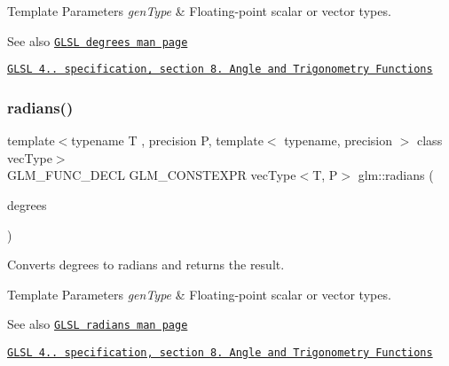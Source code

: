 \begin{DoxyTemplParams}{Template Parameters}
{\em gen\+Type} & Floating-\/point scalar or vector types.\\
\hline
\end{DoxyTemplParams}
\begin{DoxySeeAlso}{See also}
\href{http://www.opengl.org/sdk/docs/manglsl/xhtml/degrees.xml}{\tt G\+L\+SL degrees man page} 

\href{http://www.opengl.org/registry/doc/GLSLangSpec.4.20.8.pdf}{\tt G\+L\+SL 4.. specification, section 8. Angle and Trigonometry Functions} 
\end{DoxySeeAlso}
\mbox{\label{group__core__func__trigonometric_gafffb5e533f75318bdf4e0967d8a6c05c}} 
\subsubsection{\texorpdfstring{radians()}{radians()}}
{\footnotesize\ttfamily template$<$typename T , precision P, template$<$ typename, precision $>$ class vec\+Type$>$ \\
G\+L\+M\+\_\+\+F\+U\+N\+C\+\_\+\+D\+E\+CL G\+L\+M\+\_\+\+C\+O\+N\+S\+T\+E\+X\+PR vec\+Type$<$T, P$>$ glm\+::radians (\begin{DoxyParamCaption}\item[{vec\+Type$<$ T, P $>$ const \&}]{degrees }\end{DoxyParamCaption})}

Converts degrees to radians and returns the result.


\begin{DoxyTemplParams}{Template Parameters}
{\em gen\+Type} & Floating-\/point scalar or vector types.\\
\hline
\end{DoxyTemplParams}
\begin{DoxySeeAlso}{See also}
\href{http://www.opengl.org/sdk/docs/manglsl/xhtml/radians.xml}{\tt G\+L\+SL radians man page} 

\href{http://www.opengl.org/registry/doc/GLSLangSpec.4.20.8.pdf}{\tt G\+L\+SL 4.. specification, section 8. Angle and Trigonometry Functions} 
\end{DoxySeeAlso}
\mbox{\label{group__core__func__trigonometric_ga4a0ddceb6b1e64ce0e4da209dcb021d5}} 

